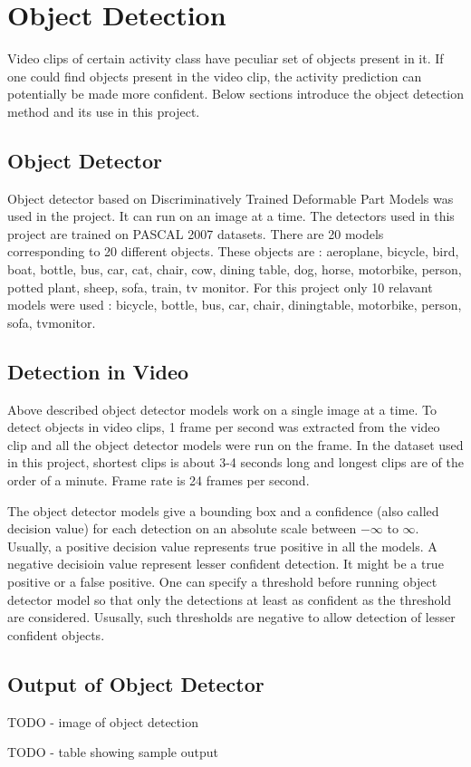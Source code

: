 \chapter{Object Detection}


Video clips of certain activity class have peculiar set of objects present in it.
If one could find objects present in the video clip, the activity prediction can 
potentially be made more confident. Below sections introduce the object detection
method and its use in this project.

\section{Object Detector}
Object detector based on Discriminatively Trained Deformable Part Models \cite{voc-release4} was used in
the project. It can run on an image at a time. The detectors used in this project are trained on PASCAL 2007 datasets.
There are 20 models corresponding to 20 different objects.
These objects are : aeroplane, bicycle,
bird, boat, bottle, bus, car, cat, chair, cow, dining table, dog, horse,
motorbike, person, potted plant, sheep, sofa, train, tv monitor.
For this project only 10 relavant models were used : bicycle, bottle, bus, car,
chair, diningtable, motorbike, person, sofa, tvmonitor.

\section{Detection in Video}
Above described object detector models work on a single image at a time. To detect objects in video clips, 1 frame per second was extracted from the video clip and all the object detector models were run on the frame. In the dataset used in this project, shortest clips is about 3-4 seconds long and longest clips are of the order of a minute. Frame rate is 24 frames per second.

The object detector models give a bounding box and a confidence (also called decision value) for each detection 
on an absolute scale between $-\infty$ to $\infty$. 
Usually, a positive decision value represents true positive in all the models. 
A negative decisioin value represent lesser confident detection. 
It might be a true positive or a false positive. 
One can specify a threshold before running object detector model 
so that only the detections at least as confident as the threshold are considered.
Ususally, such thresholds are negative to allow detection of lesser confident objects.

\section{Output of Object Detector}
TODO - image of object detection

TODO - table showing sample output
